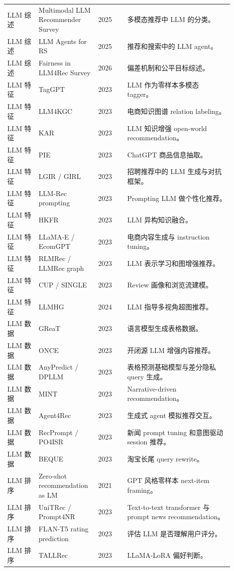 \documentclass[UTF8,fontset=fandol,11pt]{ctexart}
\begin{document}
\begin{longtable}{@{}p{0.13\linewidth}p{0.23\linewidth}p{0.12\linewidth}p{0.44\linewidth}@{}}
LLM 综述 & Multimodal LLM Recommender Survey & 2025 & 多模态推荐中 LLM 的分类。\\
LLM 综述 & LLM Agents for RS & 2025 & 推荐和搜索中的 LLM agent。\\
LLM 综述 & Fairness in LLM4Rec Survey & 2026 & 偏差机制和公平目标综述。\\
LLM 特征 & TagGPT & 2023 & LLM 作为零样本多模态 tagger。\\
LLM 特征 & LLM4KGC & 2023 & 电商知识图谱 relation labeling。\\
LLM 特征 & KAR & 2023 & LLM 知识增强 open-world recommendation。\\
LLM 特征 & PIE & 2023 & ChatGPT 商品信息抽取。\\
LLM 特征 & LGIR / GIRL & 2023 & 招聘推荐中的 LLM 生成与对抗框架。\\
LLM 特征 & LLM-Rec prompting & 2023 & Prompting LLM 做个性化推荐。\\
LLM 特征 & HKFR & 2023 & LLM 异构知识融合。\\
LLM 特征 & LLaMA-E / EcomGPT & 2023 & 电商内容生成与 instruction tuning。\\
LLM 特征 & RLMRec / LLMRec graph & 2023 & LLM 表示学习和图增强推荐。\\
LLM 特征 & CUP / SINGLE & 2023 & Review 画像和浏览流建模。\\
LLM 特征 & LLMHG & 2024 & LLM 指导多视角超图推荐。\\
LLM 数据 & GReaT & 2023 & 语言模型生成表格数据。\\
LLM 数据 & ONCE & 2023 & 开闭源 LLM 增强内容推荐。\\
LLM 数据 & AnyPredict / DPLLM & 2023 & 表格预测基础模型与差分隐私 query 生成。\\
LLM 数据 & MINT & 2023 & Narrative-driven recommendation。\\
LLM 数据 & Agent4Rec & 2023 & 生成式 agent 模拟推荐交互。\\
LLM 数据 & RecPrompt / PO4ISR & 2023 & 新闻 prompt tuning 和意图驱动 session 推荐。\\
LLM 数据 & BEQUE & 2023 & 淘宝长尾 query rewrite。\\
LLM 排序 & Zero-shot recommendation as LM & 2021 & GPT 风格零样本 next-item framing。\\
LLM 排序 & UniTRec / Prompt4NR & 2023 & Text-to-text transformer 与 prompt news recommendation。\\
LLM 排序 & FLAN-T5 rating prediction & 2023 & 评估 LLM 是否理解用户评分。\\
LLM 排序 & TALLRec & 2023 & LLaMA-LoRA 偏好判断。\\

\end{longtable}
\end{document}
